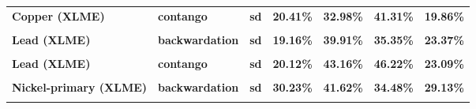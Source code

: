 \documentclass[
  authoryear,
  preprint,
  3p]{elsarticle}
\begin{document}
\begin{longtable}[t]{>{}l>{}l>{}l>{}r>{}r>{}r>{}r}
\textbf{Copper (XLME)} & \textbf{contango} & \textbf{sd} & \textcolor[HTML]{4285f4}{\textbf{20.41\%}} & \textcolor[HTML]{4285f4}{\textbf{32.98\%}} & \textcolor[HTML]{4285f4}{\textbf{41.31\%}} & \textcolor[HTML]{4285f4}{\textbf{19.86\%}}\\
\textbf{\cellcolor{gray!10}{Lead (XLME)}} & \textbf{\cellcolor{gray!10}{backwardation}} & \textbf{\cellcolor{gray!10}{mean}} & \textcolor[HTML]{4285f4}{\textbf{\cellcolor{gray!10}{7.59\%}}} & \textcolor[HTML]{4285f4}{\textbf{\cellcolor{gray!10}{11.21\%}}} & \textcolor[HTML]{4285f4}{\textbf{\cellcolor{gray!10}{9.87\%}}} & \textcolor[HTML]{4285f4}{\textbf{\cellcolor{gray!10}{17.05\%}}}\\
\addlinespace
\textbf{Lead (XLME)} & \textbf{backwardation} & \textbf{sd} & \textcolor[HTML]{4285f4}{\textbf{19.16\%}} & \textcolor[HTML]{4285f4}{\textbf{39.91\%}} & \textcolor[HTML]{4285f4}{\textbf{35.35\%}} & \textcolor[HTML]{4285f4}{\textbf{23.37\%}}\\
\textbf{\cellcolor{gray!10}{Lead (XLME)}} & \textbf{\cellcolor{gray!10}{contango}} & \textbf{\cellcolor{gray!10}{mean}} & \textcolor[HTML]{4285f4}{\textbf{\cellcolor{gray!10}{-0.09\%}}} & \textcolor[HTML]{4285f4}{\textbf{\cellcolor{gray!10}{*46.48\%}}} & \textcolor[HTML]{4285f4}{\textbf{\cellcolor{gray!10}{12.65\%}}} & \textcolor[HTML]{4285f4}{\textbf{\cellcolor{gray!10}{-13.41\%}}}\\
\textbf{Lead (XLME)} & \textbf{contango} & \textbf{sd} & \textcolor[HTML]{4285f4}{\textbf{20.12\%}} & \textcolor[HTML]{4285f4}{\textbf{43.16\%}} & \textcolor[HTML]{4285f4}{\textbf{46.22\%}} & \textcolor[HTML]{4285f4}{\textbf{23.09\%}}\\
\textbf{\cellcolor{gray!10}{Nickel-primary (XLME)}} & \textbf{\cellcolor{gray!10}{backwardation}} & \textbf{\cellcolor{gray!10}{mean}} & \textcolor[HTML]{4285f4}{\textbf{\cellcolor{gray!10}{23.25\%}}} & \textcolor[HTML]{4285f4}{\textbf{\cellcolor{gray!10}{-39.24\%}}} & \textcolor[HTML]{4285f4}{\textbf{\cellcolor{gray!10}{16.3\%}}} & \textcolor[HTML]{4285f4}{\textbf{\cellcolor{gray!10}{**35.09\%}}}\\
\textbf{Nickel-primary (XLME)} & \textbf{backwardation} & \textbf{sd} & \textcolor[HTML]{4285f4}{\textbf{30.23\%}} & \textcolor[HTML]{4285f4}{\textbf{41.62\%}} & \textcolor[HTML]{4285f4}{\textbf{34.48\%}} & \textcolor[HTML]{4285f4}{\textbf{29.13\%}}\\
\addlinespace
\textbf{\cellcolor{gray!10}{Nickel-primary (XLME)}} & \textbf{\cellcolor{gray!10}{contango}} & \textbf{\cellcolor{gray!10}{mean}} & \textcolor[HTML]{4285f4}{\textbf{\cellcolor{gray!10}{15.46\%}}} & \textcolor[HTML]{4285f4}{\textbf{\cellcolor{gray!10}{**63.47\%}}} & \textcolor[HTML]{4285f4}{\textbf{\cellcolor{gray!10}{-7.67\%}}} & \textcolor[HTML]{4285f4}{\textbf{\cellcolor{gray!10}{**-34.64\%}}}\\

\end{longtable}
\end{document}

